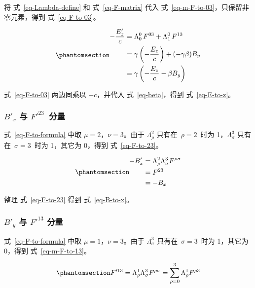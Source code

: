 \documentclass[
  chinese,
  a4paper,
  UTF8,
  12pt,
  oneside,
  openany]{ctexbook}
\theoremstyle{plain}
\theoremstyle{plain}
\theoremstyle{plain}
\theoremstyle{definition}
\theoremstyle{plain}
\theoremstyle{plain}
\theoremstyle{remark}
\begin{document}
将 式~\ref{eq-Lambda-define} 和 式~\ref{eq-F-matrix} 代入
式~\ref{eq-m-F-to-03}，只保留非零元素，得到 式~\ref{eq-F-to-03}。

\begin{equation}\protect\phantomsection\label{eq-F-to-03}{
\begin{aligned}
-\frac{E'_z}{c}
&= \Lambda_{0}^{0}\,F^{03} + \Lambda_{1}^{0}\,F^{13} \\
&= \gamma\left(-\frac{E_z}{c}\right) + (-\gamma\beta) B_y \\
&= \gamma\left(-\frac{E_z}{c} - \beta B_y \right)
\end{aligned}
}\end{equation}

式~\ref{eq-F-to-03} 两边同乘以 \(-c\)，并代入 式~\ref{eq-beta}，得到
式~\ref{eq-E-to-z}。

\subsubsection{\texorpdfstring{\(B'_x\) 与
\(F'^{23}\)~分量}{B\textquotesingle\_x 与 F\textquotesingle\^{}\{23\}~分量}}\label{b_x-ux4e0e-f23-ux5206ux91cf}

式~\ref{eq-F-to-formula} 中取 \(\mu = 2\)，\(\nu = 3\)。由于
\(\Lambda_{\rho}^{2}\) 只有在~\(\rho = 2\)~时为
1，\(\Lambda_{\sigma}^{3}\) 只有在~\(\sigma = 3\)~时为 1，其它为 0，得到
式~\ref{eq-F-to-23}。

\begin{equation}\protect\phantomsection\label{eq-F-to-23}{
\begin{aligned}
-B'_x &= \Lambda_{\rho}^{2}\Lambda_{\sigma}^{3}F^{\rho\sigma}\\
 &= F^{23}\\
 &= -B_x
\end{aligned}
}\end{equation}

整理 式~\ref{eq-F-to-23} 得到 式~\ref{eq-B-to-x}。

\subsubsection{\texorpdfstring{\(B'_y\) 与 \(F'^{13}\)
分量}{B\textquotesingle\_y 与 F\textquotesingle\^{}\{13\} 分量}}\label{b_y-ux4e0e-f13-ux5206ux91cf}

式~\ref{eq-F-to-formula} 中取 \(\mu = 1\)，\(\nu = 3\)。由于
\(\Lambda_{\sigma}^{3}\) 只有在~\(\sigma = 3\)~时为 1，其它为 0，得到
式~\ref{eq-m-F-to-13}。

\begin{equation}\protect\phantomsection\label{eq-m-F-to-13}{
F'^{13} = \Lambda_{\rho}^{1}\Lambda_{\sigma}^{3}F^{\rho\sigma}
= \sum_{\rho = 0}^{3}\Lambda_{\rho}^{1}F^{\rho 3}
}\end{equation}
\end{document}
